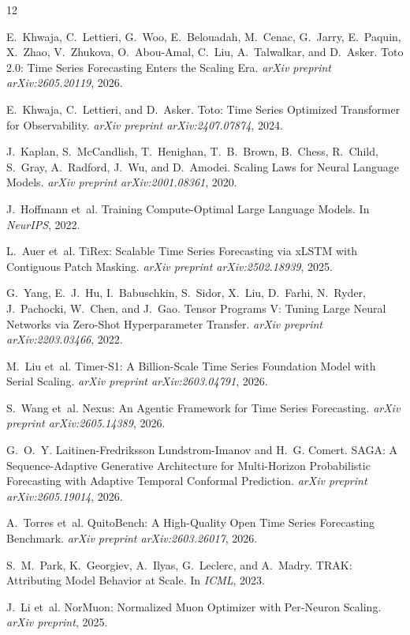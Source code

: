 \documentclass[11pt,a4paper]{article}
\begin{document}

\begin{thebibliography}{12}

E.~Khwaja, C.~Lettieri, G.~Woo, E.~Belouadah, M.~Cenac, G.~Jarry, E.~Paquin, X.~Zhao, V.~Zhukova, O.~Abou-Amal, C.~Liu, A.~Talwalkar, and D.~Asker.
\newblock Toto 2.0: Time Series Forecasting Enters the Scaling Era.
\newblock \emph{arXiv preprint arXiv:2605.20119}, 2026.

E.~Khwaja, C.~Lettieri, and D.~Asker.
\newblock Toto: Time Series Optimized Transformer for Observability.
\newblock \emph{arXiv preprint arXiv:2407.07874}, 2024.

J.~Kaplan, S.~McCandlish, T.~Henighan, T.~B.~Brown, B.~Chess, R.~Child, S.~Gray, A.~Radford, J.~Wu, and D.~Amodei.
\newblock Scaling Laws for Neural Language Models.
\newblock \emph{arXiv preprint arXiv:2001.08361}, 2020.

J.~Hoffmann et~al.
\newblock Training Compute-Optimal Large Language Models.
\newblock In \emph{NeurIPS}, 2022.

L.~Auer et~al.
\newblock TiRex: Scalable Time Series Forecasting via xLSTM with Contiguous Patch Masking.
\newblock \emph{arXiv preprint arXiv:2502.18939}, 2025.

G.~Yang, E.~J.~Hu, I.~Babuschkin, S.~Sidor, X.~Liu, D.~Farhi, N.~Ryder, J.~Pachocki, W.~Chen, and J.~Gao.
\newblock Tensor Programs V: Tuning Large Neural Networks via Zero-Shot Hyperparameter Transfer.
\newblock \emph{arXiv preprint arXiv:2203.03466}, 2022.

M.~Liu et~al.
\newblock Timer-S1: A Billion-Scale Time Series Foundation Model with Serial Scaling.
\newblock \emph{arXiv preprint arXiv:2603.04791}, 2026.

S.~Wang et~al.
\newblock Nexus: An Agentic Framework for Time Series Forecasting.
\newblock \emph{arXiv preprint arXiv:2605.14389}, 2026.

G.~O.~Y. Laitinen-Fredriksson Lundstrom-Imanov and H.~G. Comert.
\newblock SAGA: A Sequence-Adaptive Generative Architecture for Multi-Horizon Probabilistic Forecasting with Adaptive Temporal Conformal Prediction.
\newblock \emph{arXiv preprint arXiv:2605.19014}, 2026.

A.~Torres et~al.
\newblock QuitoBench: A High-Quality Open Time Series Forecasting Benchmark.
\newblock \emph{arXiv preprint arXiv:2603.26017}, 2026.

S.~M.~Park, K.~Georgiev, A.~Ilyas, G.~Leclerc, and A.~Madry.
\newblock TRAK: Attributing Model Behavior at Scale.
\newblock In \emph{ICML}, 2023.

J.~Li et~al.
\newblock NorMuon: Normalized Muon Optimizer with Per-Neuron Scaling.
\newblock \emph{arXiv preprint}, 2025.

\end{thebibliography}
\end{document}
